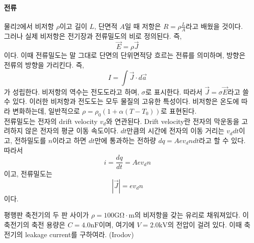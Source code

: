 \paragraph{전류}물리2에서 비저항 $\rho$이고 길이 $L$, 단면적 $A$일 때 저항은 $R=\rho\frac{L}{A}$라고 배웠을 것이다. 그러나 실제 비저항은 전기장과 전류밀도의 비로 정의된다. 즉,
\begin{equation}
\vec{E}=\rho\vec{J}
\end{equation}
이다. 이때 전류밀도는 말 그대로 단면의 단위면적당 흐르는 전류를 의미하며, 방향은 전류의 방향을 가리킨다. 즉, 
\begin{equation}
I=\int \vec{J}\cdot d\vec{a}
\end{equation}
가 성립한다.
비저항의 역수는 전도도라고 하며, $\sigma$로 표시한다. 따라서 $\vec{J}=\sigma\vec{E}$라고 쓸 수 있다. 이러한 비저항과 전도도는 모두 물질의 고유한 특성이다. 비저항은 온도에 따라 변화하는데, 일반적으로 $\rho = \rho_0(1+\alpha (T-T_0))$로 표현된다. \\
전류밀도는 전자의 drift velocity $v_d$와 연관된다. Drift velocity란 전자의 막운동을 고려하지 않은 전자의 평균 이동 속도이다. $dt$만큼의 시간에 전자의 이동 거리는 $v_ddt$이고, 전하밀도를 $n$이라고 하면 $dt$만에 통과하는 전하량 $dq=Aev_dndt$라고 할 수 있다. 따라서
\begin{equation}
i=\frac{dq}{dt}=Aev_dn
\end{equation}
이고, 전류밀도는
\begin{equation}
|\vec{J}|=ev_dn
\end{equation}
이다.

\begin{example}
평행판 축전기의 두 판 사이가 $\rho =100\mathrm{G\Omega\cdot m}$의 비저항을 갖는 유리로 채워져있다. 이 축전기의 축전 용량은 $C=4.0 \mathrm{nF}$이며, 여기에 $V=2.0\mathrm{kV}$의 전압이 걸려 있다. 이때 축전기의 leakage current를 구하여라. (Irodov)
\end{example}

